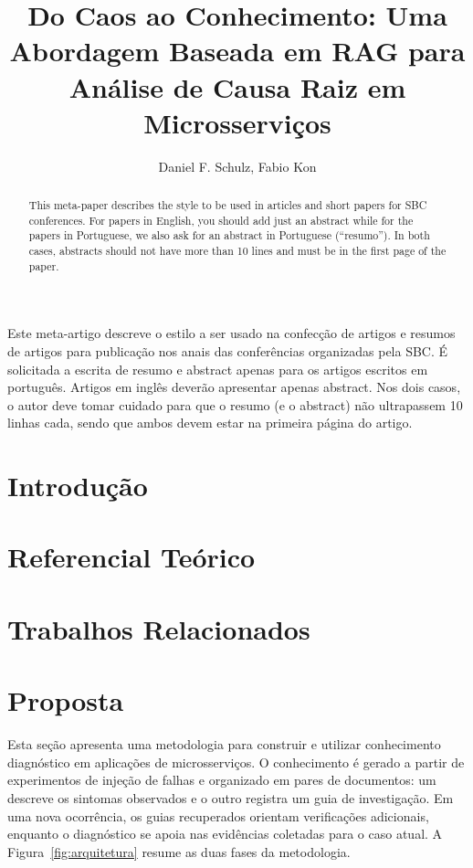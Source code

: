 \documentclass[12pt]{article}
\title{Do Caos ao Conhecimento: Uma Abordagem Baseada em RAG para Análise de Causa Raiz em Microsserviços}
\author{Daniel F. Schulz\inst{1}, Fabio Kon\inst{1}}
\begin{document}
 

\maketitle

\begin{abstract}
  This meta-paper describes the style to be used in articles and short papers
  for SBC conferences. For papers in English, you should add just an abstract
  while for the papers in Portuguese, we also ask for an abstract in
  Portuguese (``resumo''). In both cases, abstracts should not have more than
  10 lines and must be in the first page of the paper.
\end{abstract}
     
\begin{resumo} 
  Este meta-artigo descreve o estilo a ser usado na confecção de artigos e
  resumos de artigos para publicação nos anais das conferências organizadas
  pela SBC. É solicitada a escrita de resumo e abstract apenas para os artigos
  escritos em português. Artigos em inglês deverão apresentar apenas abstract.
  Nos dois casos, o autor deve tomar cuidado para que o resumo (e o abstract)
  não ultrapassem 10 linhas cada, sendo que ambos devem estar na primeira
  página do artigo.
\end{resumo}


\section{Introdução}



\section{Referencial Teórico} \label{sec:firstpage}



\section{Trabalhos Relacionados}


\section{Proposta}

Esta seção apresenta uma metodologia para construir e utilizar conhecimento
diagnóstico em aplicações de microsserviços. O conhecimento é gerado a partir
de experimentos de injeção de falhas e organizado em pares de documentos: um
descreve os sintomas observados e o outro registra um guia de investigação.
Em uma nova ocorrência, os guias recuperados orientam verificações adicionais,
enquanto o diagnóstico se apoia nas evidências coletadas para o caso atual.
A Figura~\ref{fig:arquitetura} resume as duas fases da metodologia.
\end{document}
